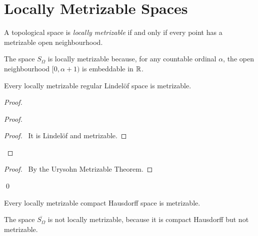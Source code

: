 \section{Locally Metrizable Spaces}

\begin{definition}
    A topological space is \emph{locally metrizable} if and only if
    every point has a metrizable open neighbourhood.
\end{definition}

\begin{example}
    The space $S_\Omega$ is locally metrizable because, for any countable ordinal $\alpha$,
    the open neighbourhood $[0,\alpha + 1)$ is embeddable in $\mathbb{R}$.
\end{example}

\begin{proposition}
    Every locally metrizable regular Lindel\"{o}f space is metrizable.
\end{proposition}

\begin{proof}
    \pf
    \begin{proof}
        \begin{proof}
            \pf\ It is Lindel\"{o}f and metrizable.
        \end{proof}
    \end{proof}
    \begin{proof}
        \pf\ By the Urysohn Metrizable Theorem.
    \end{proof}
    \qed
\end{proof}

\begin{corollary}
    Every locally metrizable compact Hausdorff space is metrizable.
\end{corollary}

\begin{example}
    The space $\overline{S_\Omega}$ is not locally metrizable, because it is compact Hausdorff but not metrizable.
\end{example}

